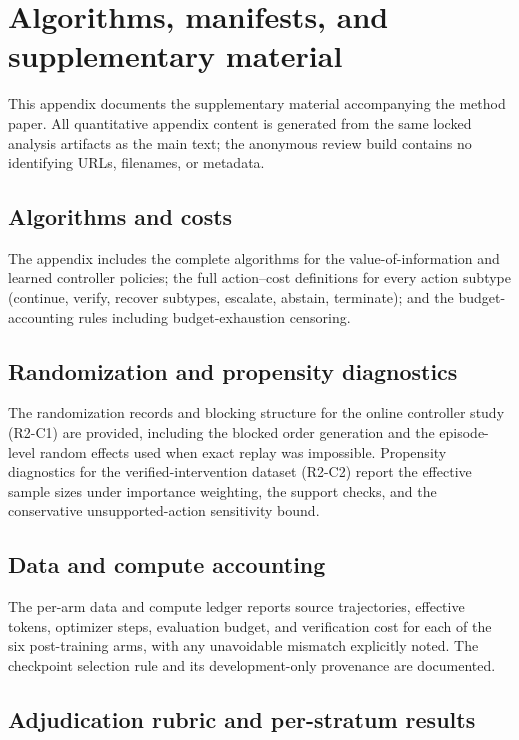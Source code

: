 \section{Algorithms, manifests, and supplementary material}
\label{app:supplement}

This appendix documents the supplementary material accompanying the method
paper. All quantitative appendix content is generated from the same locked
analysis artifacts as the main text; the anonymous review build contains no
identifying URLs, filenames, or metadata.

\subsection{Algorithms and costs}

The appendix includes the complete algorithms for the value-of-information
and learned controller policies; the full action--cost definitions for every
action subtype (continue, verify, recover subtypes, escalate, abstain,
terminate); and the budget-accounting rules including budget-exhaustion
censoring.

\subsection{Randomization and propensity diagnostics}

The randomization records and blocking structure for the online controller
study (R2-C1) are provided, including the blocked order generation and the
episode-level random effects used when exact replay was impossible.
Propensity diagnostics for the verified-intervention dataset (R2-C2) report
the effective sample sizes under importance weighting, the support checks,
and the conservative unsupported-action sensitivity bound.

\subsection{Data and compute accounting}

The per-arm data and compute ledger reports source trajectories, effective
tokens, optimizer steps, evaluation budget, and verification cost for each
of the six post-training arms, with any unavoidable mismatch explicitly
noted. The checkpoint selection rule and its development-only provenance
are documented.

\subsection{Adjudication rubric and per-stratum results}

